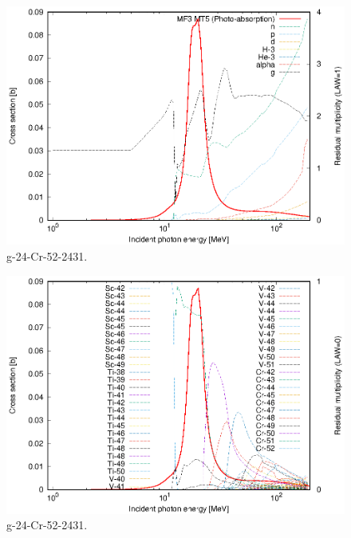 \begin{figure}
 \includegraphics[width=\linewidth]{eps/g_24-Cr-52_2431.eps}
  \caption{g-24-Cr-52-2431.}
\end{figure}
\begin{figure}
 \includegraphics[width=\linewidth]{eps-law0/g_24-Cr-52_2431.eps}
 \caption{g-24-Cr-52-2431.}
\end{figure}
\newpage \clearpage

